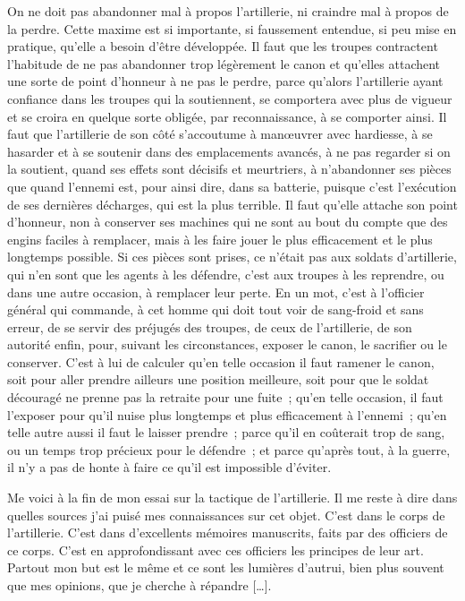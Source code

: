 \documentclass[french,twoside]{book} %
\begin{document}
On ne doit pas abandonner mal à propos l’artillerie, ni craindre mal à propos de la perdre. Cette maxime est si importante, si faussement entendue, si peu mise en pratique, qu’elle a besoin d’être développée. Il faut que les troupes contractent l’habitude de ne pas abandonner trop légèrement le canon et qu’elles attachent une sorte de point d’honneur à ne pas le perdre, parce qu’alors l’artillerie ayant confiance dans les troupes qui la soutiennent, se comportera avec plus de vigueur et se croira en quelque sorte obligée, par reconnaissance, à se comporter ainsi. Il faut que l’artillerie de son côté s’accoutume à manœuvrer avec hardiesse, à se hasarder et à se soutenir dans des emplacements avancés, à ne pas regarder si on la soutient, quand ses effets sont décisifs et meurtriers, à n’abandonner ses pièces que quand l’ennemi est, pour ainsi dire, dans sa batterie, puisque c’est l’exécution de ses dernières décharges, qui est la plus terrible. Il faut qu’elle attache son point d’honneur, non à conserver ses machines qui ne sont au bout du compte que des engins faciles à remplacer, mais à les faire jouer le plus efficacement et le plus longtemps possible. Si ces pièces sont prises, ce n’était pas aux soldats d’artillerie, qui n’en sont que les agents à les défendre, c’est aux troupes à les reprendre, ou dans une autre occasion, à remplacer leur perte. En un mot, c’est à l’officier général qui commande, à cet homme qui doit tout voir de sang-froid et sans erreur, de se servir des préjugés des troupes, de ceux de l’artillerie, de son autorité enfin, pour, suivant les circonstances, exposer le canon, le sacrifier ou le conserver. C’est à lui de calculer qu’en telle occasion il faut ramener le canon, soit pour aller prendre ailleurs une position meilleure, soit pour que le soldat découragé ne prenne pas la retraite pour une fuite ; qu’en telle occasion, il faut l’exposer pour qu’il nuise plus longtemps et plus efficacement à l’ennemi ; qu’en telle autre aussi il faut le laisser prendre ; parce qu’il en coûterait trop de sang, ou un temps trop précieux pour le défendre ; et parce qu’après tout, à la guerre, il n’y a pas de honte à faire ce qu’il est impossible d’éviter.\par
Me voici à la fin de mon essai sur la tactique de l’artillerie. Il me reste à dire dans quelles sources j’ai puisé mes connaissances sur cet objet. C’est dans le corps de l’artillerie. C’est dans d’excellents mémoires manuscrits, faits par des officiers de ce corps. C’est en approfondissant avec ces officiers les principes de leur art. Partout mon but est le même et ce sont les lumières d’autrui, bien plus souvent que mes opinions, que je cherche à répandre […].
\end{document}
